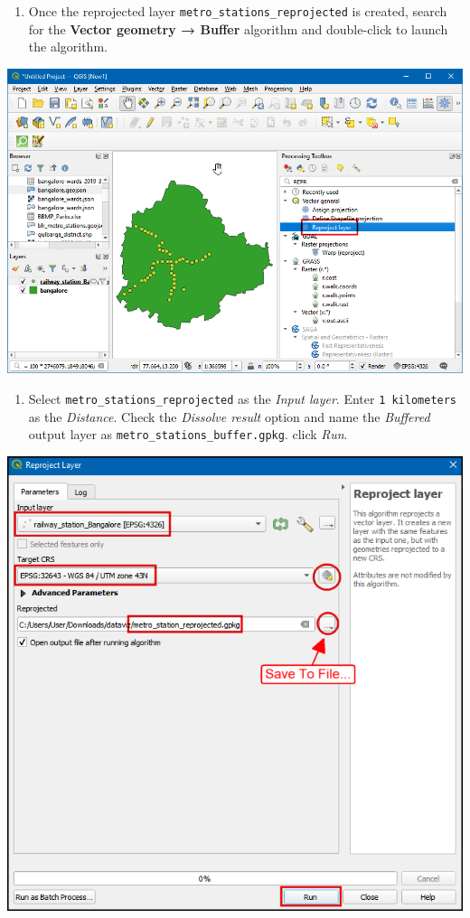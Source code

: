 \documentclass[
  12pt,
  a4paper]{article}
\providecommand{\tightlist}{%
  \setlength{\itemsep}{0pt}\setlength{\parskip}{0pt}}
\begin{document}
\begin{enumerate}
\def\labelenumi{\arabic{enumi}.}
\setcounter{enumi}{6}
\tightlist
\item
  Once the reprojected layer \texttt{metro\_stations\_reprojected} is
  created, search for the \textbf{Vector geometry → Buffer} algorithm
  and double-click to launch the algorithm.
\end{enumerate}

\begin{center}\includegraphics[width=0.75\linewidth]{images/spatial_data_viz/pop7} \end{center}

\begin{enumerate}
\def\labelenumi{\arabic{enumi}.}
\setcounter{enumi}{7}
\tightlist
\item
  Select \texttt{metro\_stations\_reprojected} as the \emph{Input
  layer}. Enter \texttt{1\ kilometers} as the \emph{Distance}. Check the
  \emph{Dissolve result} option and name the \emph{Buffered} output
  layer as \texttt{metro\_stations\_buffer.gpkg}. click \emph{Run}.
\end{enumerate}

\begin{center}\includegraphics[width=0.75\linewidth]{images/spatial_data_viz/pop8} \end{center}
\end{document}

